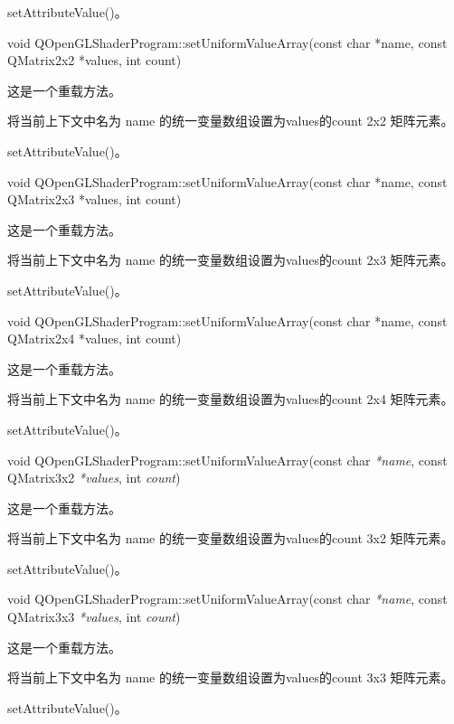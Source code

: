 \begin{seeAlso}
setAttributeValue()。
\end{seeAlso}

void QOpenGLShaderProgram::setUniformValueArray(const char *name, const QMatrix2x2 *values, int count)

这是一个重载方法。

将当前上下文中名为 name 的统一变量数组设置为values的count 2x2 矩阵元素。

\begin{seeAlso}
setAttributeValue()。
\end{seeAlso}

void QOpenGLShaderProgram::setUniformValueArray(const char *name, const QMatrix2x3 *values, int count)

这是一个重载方法。

将当前上下文中名为 name 的统一变量数组设置为values的count 2x3 矩阵元素。

\begin{seeAlso}
setAttributeValue()。
\end{seeAlso}

void QOpenGLShaderProgram::setUniformValueArray(const char *name, const QMatrix2x4 *values, int count)

这是一个重载方法。

将当前上下文中名为 name 的统一变量数组设置为values的count 2x4 矩阵元素。

\begin{seeAlso}
setAttributeValue()。
\end{seeAlso}

void QOpenGLShaderProgram::setUniformValueArray(const char \emph{*name}, const QMatrix3x2 \emph{*values}, int \emph{count})

这是一个重载方法。

将当前上下文中名为 name 的统一变量数组设置为values的count 3x2 矩阵元素。

\begin{seeAlso}
setAttributeValue()。
\end{seeAlso}

void QOpenGLShaderProgram::setUniformValueArray(const char \emph{*name}, const QMatrix3x3 \emph{*values}, int \emph{count})

这是一个重载方法。

将当前上下文中名为 name 的统一变量数组设置为values的count 3x3 矩阵元素。

\begin{seeAlso}
setAttributeValue()。
\end{seeAlso}

